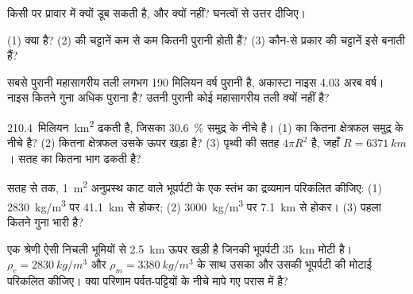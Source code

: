 \begin{exercise}[$\star$]\label{exo:g12:continental-crust:3}
 किसी  पर प्रावार में क्यों डूब सकती है, और
 क्यों नहीं? घनत्वों से उत्तर दीजिए।
\end{exercise}

\begin{exercise}[$\star$]\label{exo:g12:continental-crust:4}
(1)  क्या है? (2)  की चट्टानें कम से कम कितनी पुरानी होती हैं?
(3) कौन-से प्रकार की चट्टानें इसे बनाती हैं?
\end{exercise}

\begin{exercise}[$\star$]\label{exo:g12:continental-crust:5}
सबसे पुरानी महासागरीय तली लगभग 190 मिलियन वर्ष पुरानी है, अकास्टा नाइस
4.03 अरब वर्ष। नाइस कितने गुना अधिक पुराना है? उतनी पुरानी कोई महासागरीय तली
क्यों नहीं है?
\end{exercise}

\begin{exercise}[$\star\star$]\label{exo:g12:continental-crust:6}
 \num{210.4}~मिलियन~\unit{km^2} ढकती है, जिसका
\qty{30.6}{\percent} समुद्र के नीचे है। (1)  का कितना क्षेत्रफल
समुद्र के नीचे है? (2) कितना क्षेत्रफल उसके ऊपर खड़ा है? (3) पृथ्वी की सतह
$4\pi R^2$ है, जहाँ $R = \qty{6371}{km}$।  सतह का कितना भाग
ढकती है?
\end{exercise}

\begin{exercise}[$\star\star$]\label{exo:g12:continental-crust:7}
सतह से  तक, \qty{1}{m^2} अनुप्रस्थ काट वाले भूपर्पटी के एक स्तंभ का
द्रव्यमान परिकलित कीजिए: (1) \qty{2830}{kg/m^3} पर \qty{41.1}{km}  से होकर; (2) \qty{3000}{kg/m^3} पर \qty{7.1}{km}  से होकर।
(3) पहला कितने गुना भारी है?
\end{exercise}

\begin{exercise}[$\star\star$]\label{exo:g12:continental-crust:8}
एक श्रेणी ऐसी निचली भूमियों से \qty{2.5}{km} ऊपर खड़ी है जिनकी भूपर्पटी \qty{35}{km}
मोटी है। $\rho_c = \qty{2830}{kg/m^3}$ और $\rho_m =
\qty{3380}{kg/m^3}$ के साथ उसका  और उसकी भूपर्पटी की मोटाई परिकलित कीजिए। क्या
परिणाम पर्वत-पट्टियों के नीचे मापे गए परास में है?
\end{exercise}

